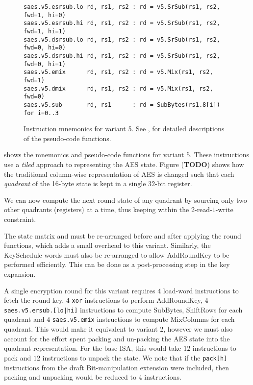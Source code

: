 
\begin{figure}
\begin{lstlisting}[language=pseudo,style=block]
saes.v5.esrsub.lo rd, rs1, rs2 : rd = v5.SrSub(rs1, rs2, fwd=1, hi=0)
saes.v5.esrsub.hi rd, rs1, rs2 : rd = v5.SrSub(rs1, rs2, fwd=1, hi=1)
saes.v5.dsrsub.lo rd, rs1, rs2 : rd = v5.SrSub(rs1, rs2, fwd=0, hi=0)
saes.v5.dsrsub.hi rd, rs1, rs2 : rd = v5.SrSub(rs1, rs2, fwd=0, hi=1)
saes.v5.emix      rd, rs1, rs2 : rd = v5.Mix(rs1, rs2, fwd=1)
saes.v5.dmix      rd, rs1, rs2 : rd = v5.Mix(rs1, rs2, fwd=0)
saes.v5.sub       rd, rs1      : rd = SubBytes(rs1.8[i])         for i=0..3
\end{lstlisting}
\caption{
    Instruction mnemonics for variant 5.
    See ,  for detailed
    descriptions of the pseudo-code functions.
}
\label{fig:mnemonics:v5}
\end{figure}

 shows the mnemonics and pseudo-code functions
for variant 5.
These instructions use a {\em tiled} approach to representing the
AES state.
Figure ({\bf TODO}) shows how the traditional column-wise representation
of AES is changed such that each {\em quadrant} of the 16-byte state
is kept in a single $32$-bit register.

We can now compute the next round state of any quadrant by sourcing
only two other quadrants (registers) at a time, thus keeping within
the $2$-read-$1$-write constraint.

The state matrix and must be re-arranged before and after applying
the round functions, which adds a small overhead to this variant.
Similarly, the KeySchedule words must also be re-arranged to allow
AddRoundKey to be performed efficiently.
This can be done as a post-processing step in the key expansion.

A single encryption round for this variant requires
$4$ load-word instructions to fetch the round key,
$4$ {\tt xor} instructions to perform AddRoundKey,
$4$ {\tt saes.v5.ersub.[lo|hi]} instructions to compute
    SubBytes, ShiftRows for each quadrant
and
$4$ {\tt saes.v5.emix} instructions to compute MixColumns for each
quadrant.
This would make it equivalent to variant 2, however we must also
account for the effort spent packing and un-packing the AES
state into the quadrant representation.
For the base ISA, this would take $12$ instructions to pack and
$12$ instructions to unpack the state.
We note that if the {\tt pack[h]} instructions from the draft
Bit-manipulation extension were included, then packing and unpacking
would be reduced to $4$ instructions.


